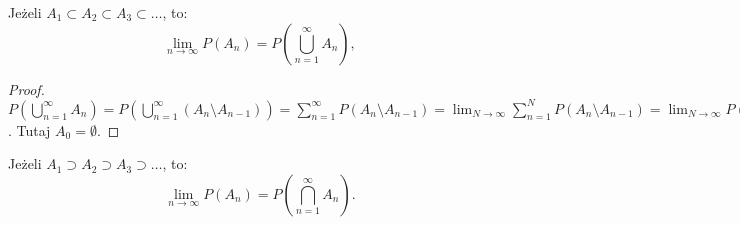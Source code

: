 \documentclass[final,a4paper,openany,12pt]{mwbk}
\begin{document}
\begin{Tw}
Jeżeli $A_1 \subset A_2 \subset A_3 \subset \dots$, to:
\[ \lim_{n\to\infty} P(A_n) = P\left(\bigcup_{n=1}^{\infty} A_n\right), \]
\end{Tw}
\begin{proof}
$P\left(\bigcup_{n=1}^{\infty} A_n\right) = P\left(\bigcup_{n=1}^{\infty} (A_n \setminus A_{n-1})\right) = \sum_{n=1}^{\infty} P(A_n \setminus A_{n-1}) = \lim_{N\to\infty} \sum_{n=1}^{N} P(A_n \setminus A_{n-1}) = \lim_{N\to\infty} P(A_N)$. Tutaj $A_0 = \emptyset$.
\end{proof}

\begin{Tw}
Jeżeli $A_1 \supset A_2 \supset A_3 \supset \dots$, to:
\[ \lim_{n\to\infty} P(A_n) = P\left(\bigcap_{n=1}^{\infty} A_n\right). \]
\end{Tw}




\printbibliography
\end{document}
